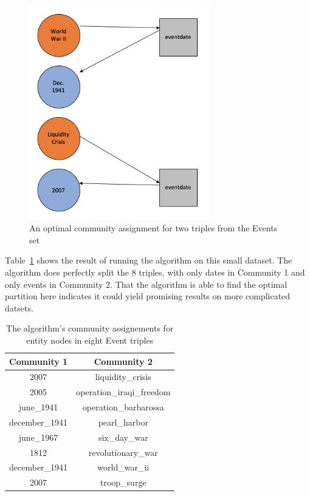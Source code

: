 \documentclass[12pt]{article}
\begin{document}
\begin{figure}[t!]
    \centering
    \includegraphics[width=0.7\textwidth,keepaspectratio]{figures/event_example.png}
    \caption{An optimal community assignment for two triples from the Events set}
    \label{fig: events}
\end{figure}

Table~\ref{tab: events} shows the result of running the algorithm on this small
dataset. The algorithm does perfectly split the 8 triples, with only dates in
Community 1 and only events in Community 2. That the algorithm is able to find
the optimal partition here indicates it could yield promising results on more
complicated datsets.

\begin{table}[!tb]
        \centering
    \begin{tabular}{|c|c|}
        \hline
        Community 1 & Community 2 \\ \hline
        2007 & liquidity\_crisis \\
        2005 & operation\_iraqi\_freedom \\
        june\_1941 & operation\_barbarossa \\
        december\_1941 & pearl\_harbor \\
        june\_1967 & six\_day\_war \\
        1812 & revolutionary\_war \\
        december\_1941 & world\_war\_ii \\
        2007 & troop\_surge \\
        \hline
    \end{tabular}
    \caption{The algorithm's community assignements for entity nodes in eight Event triples}
    \label{tab: events}
\end{table}
\end{document}
